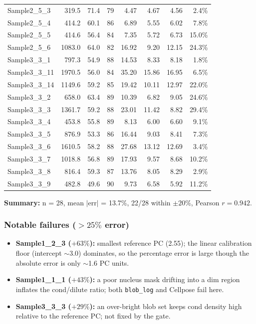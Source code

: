 \documentclass[11pt]{article}
\newcommand{\code}[1]{\texttt{\small #1}}
\begin{document}
\begin{center}
\begin{longtable}{l r r r r r r r}
Sample2\_5\_3 & 319.5 & 71.4 & 79 & 4.47 & 4.67 & 4.56 & 2.4\% \\
Sample2\_5\_4 & 414.2 & 60.1 & 86 & 6.89 & 5.55 & 6.02 & 7.8\% \\
Sample2\_5\_5 & 414.6 & 56.4 & 84 & 7.35 & 5.72 & 6.73 & 15.0\% \\
Sample2\_5\_6 & 1083.0 & 64.0 & 82 & 16.92 & 9.20 & 12.15 & 24.3\% \\
Sample3\_3\_1 & 797.3 & 54.9 & 88 & 14.53 & 8.33 & 8.18 & 1.8\% \\
Sample3\_3\_11 & 1970.5 & 56.0 & 84 & 35.20 & 15.86 & 16.95 & 6.5\% \\
Sample3\_3\_14 & 1149.6 & 59.2 & 85 & 19.42 & 10.11 & 12.97 & 22.0\% \\
Sample3\_3\_2 & 658.0 & 63.4 & 89 & 10.39 & 6.82 & 9.05 & 24.6\% \\
Sample3\_3\_3 & 1361.7 & 59.2 & 88 & 23.01 & 11.42 & 8.82 & 29.4\% \\
Sample3\_3\_4 & 453.8 & 55.8 & 89 & 8.13 & 6.00 & 6.60 & 9.1\% \\
Sample3\_3\_5 & 876.9 & 53.3 & 86 & 16.44 & 9.03 & 8.41 & 7.3\% \\
Sample3\_3\_6 & 1610.5 & 58.2 & 88 & 27.68 & 13.12 & 12.69 & 3.4\% \\
Sample3\_3\_7 & 1018.8 & 56.8 & 89 & 17.93 & 9.57 & 8.68 & 10.2\% \\
Sample3\_3\_8 & 816.4 & 59.3 & 87 & 13.76 & 8.05 & 8.29 & 2.9\% \\
Sample3\_3\_9 & 482.8 & 49.6 & 90 & 9.73 & 6.58 & 5.92 & 11.2\% \\
\end{longtable}
\end{center}
\vspace{0.5em}
\textbf{Summary:} n = 28, mean $|\text{err}|$ = 13.7\%, 22/28 within $\pm 20\%$, Pearson $r = 0.942$.

\subsubsection{Notable failures ($>25\%$ error)}
\begin{itemize}\setlength{\itemsep}{1pt}
\item \textbf{Sample1\_2\_3 ($+63\%$):} smallest reference PC (2.55); the linear calibration
floor (intercept $\sim$3.0) dominates, so the percentage error is large though the absolute
error is only $\sim$1.6 PC units.
\item \textbf{Sample1\_1\_1 ($+43\%$):} a poor nucleus mask drifting into a dim region inflates
the cond/dilute ratio; both \code{blob\_log} and Cellpose fail here.
\item \textbf{Sample3\_3\_3 ($+29\%$):} an over-bright blob set keeps cond density high relative
to the reference PC; not fixed by the gate.
\end{itemize}
\newpage
\end{document}
